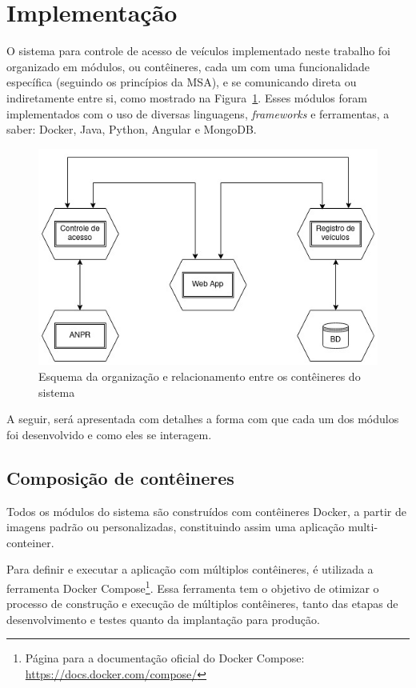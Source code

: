 \documentclass[12pt]{article}
\begin{document}
\section{Implementação}

O sistema para controle de acesso de veículos implementado neste trabalho foi organizado em módulos, ou contêineres, cada um com uma funcionalidade específica (seguindo os princípios da MSA), e se comunicando direta ou indiretamente entre si, como mostrado na Figura~\ref{fig:anpr-auth}. Esses módulos foram implementados com o uso de diversas linguagens, \textit{frameworks} e ferramentas, a saber: Docker, Java, Python, Angular e MongoDB.

\begin{figure}[ht]
	\centering
	\includegraphics[width=.8\textwidth]{anpr-auth.jpg}
	\caption{Esquema da organização e relacionamento entre os contêineres do sistema}
	\label{fig:anpr-auth}
\end{figure}

A seguir, será apresentada com detalhes a forma com que cada um dos módulos foi desenvolvido e como eles se interagem.

\subsection{Composição de contêineres}

Todos os módulos do sistema são construídos com contêineres Docker, a partir de imagens padrão ou personalizadas, constituindo assim uma aplicação multi-conteiner.

Para definir e executar a aplicação com múltiplos contêineres, é utilizada a ferramenta Docker Compose\footnote{Página para a documentação oficial do Docker Compose: \url{https://docs.docker.com/compose/}}. Essa ferramenta tem o objetivo de otimizar o processo de construção e execução de múltiplos contêineres, tanto das etapas de desenvolvimento e testes quanto da implantação para produção.
\end{document}
